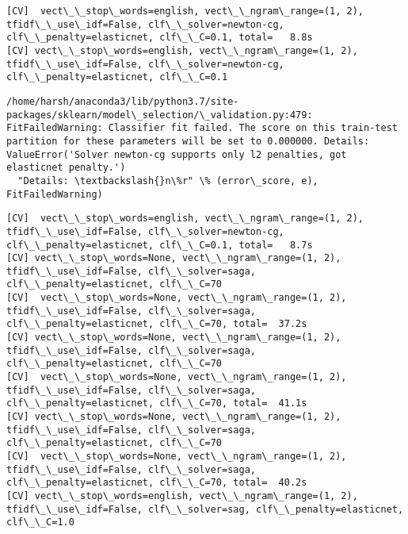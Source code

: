 \documentclass[11pt]{article}
\begin{document}
    \begin{Verbatim}[commandchars=\\\{\}]
[CV]  vect\_\_stop\_words=english, vect\_\_ngram\_range=(1, 2), tfidf\_\_use\_idf=False, clf\_\_solver=newton-cg, clf\_\_penalty=elasticnet, clf\_\_C=0.1, total=   8.8s
[CV] vect\_\_stop\_words=english, vect\_\_ngram\_range=(1, 2), tfidf\_\_use\_idf=False, clf\_\_solver=newton-cg, clf\_\_penalty=elasticnet, clf\_\_C=0.1 

    \end{Verbatim}

    \begin{Verbatim}[commandchars=\\\{\}]
/home/harsh/anaconda3/lib/python3.7/site-packages/sklearn/model\_selection/\_validation.py:479: FitFailedWarning: Classifier fit failed. The score on this train-test partition for these parameters will be set to 0.000000. Details: 
ValueError('Solver newton-cg supports only l2 penalties, got elasticnet penalty.')
  "Details: \textbackslash{}n\%r" \% (error\_score, e), FitFailedWarning)

    \end{Verbatim}

    \begin{Verbatim}[commandchars=\\\{\}]
[CV]  vect\_\_stop\_words=english, vect\_\_ngram\_range=(1, 2), tfidf\_\_use\_idf=False, clf\_\_solver=newton-cg, clf\_\_penalty=elasticnet, clf\_\_C=0.1, total=   8.7s
[CV] vect\_\_stop\_words=None, vect\_\_ngram\_range=(1, 2), tfidf\_\_use\_idf=False, clf\_\_solver=saga, clf\_\_penalty=elasticnet, clf\_\_C=70 
[CV]  vect\_\_stop\_words=None, vect\_\_ngram\_range=(1, 2), tfidf\_\_use\_idf=False, clf\_\_solver=saga, clf\_\_penalty=elasticnet, clf\_\_C=70, total=  37.2s
[CV] vect\_\_stop\_words=None, vect\_\_ngram\_range=(1, 2), tfidf\_\_use\_idf=False, clf\_\_solver=saga, clf\_\_penalty=elasticnet, clf\_\_C=70 
[CV]  vect\_\_stop\_words=None, vect\_\_ngram\_range=(1, 2), tfidf\_\_use\_idf=False, clf\_\_solver=saga, clf\_\_penalty=elasticnet, clf\_\_C=70, total=  41.1s
[CV] vect\_\_stop\_words=None, vect\_\_ngram\_range=(1, 2), tfidf\_\_use\_idf=False, clf\_\_solver=saga, clf\_\_penalty=elasticnet, clf\_\_C=70 
[CV]  vect\_\_stop\_words=None, vect\_\_ngram\_range=(1, 2), tfidf\_\_use\_idf=False, clf\_\_solver=saga, clf\_\_penalty=elasticnet, clf\_\_C=70, total=  40.2s
[CV] vect\_\_stop\_words=english, vect\_\_ngram\_range=(1, 2), tfidf\_\_use\_idf=False, clf\_\_solver=sag, clf\_\_penalty=elasticnet, clf\_\_C=1.0 

    \end{Verbatim}
\end{document}
